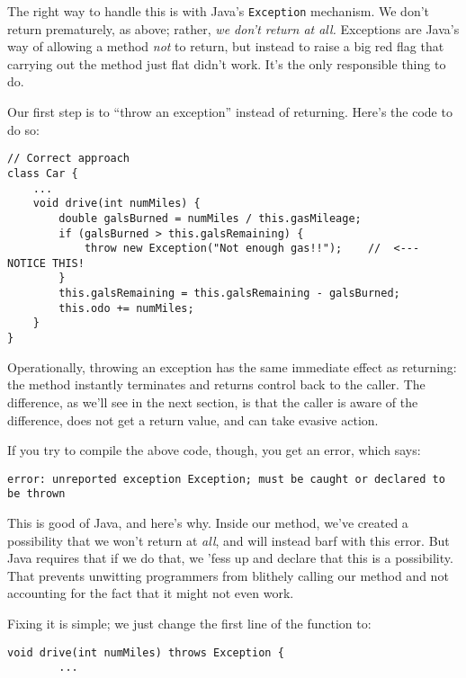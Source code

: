 The right way to handle this is with Java's \texttt{Exception} mechanism. We
don't return prematurely, as above; rather, \textit{we don't return at all.}
Exceptions are Java's way of allowing a method \textit{not} to return, but
instead to raise a big red flag that carrying out the method just flat didn't
work. It's the only responsible thing to do.

Our first step is to ``throw an exception'' instead of returning. Here's the
code to do so:

\begin{Verbatim}[samepage=true,fontsize=\scriptsize,frame=single]
// Correct approach
class Car {
    ...
    void drive(int numMiles) {
        double galsBurned = numMiles / this.gasMileage;
        if (galsBurned > this.galsRemaining) {
            throw new Exception("Not enough gas!!");    //  <---  NOTICE THIS!
        }
        this.galsRemaining = this.galsRemaining - galsBurned;
        this.odo += numMiles;
    }
}
\end{Verbatim}

Operationally, throwing an exception has the same immediate effect as
returning: the method instantly terminates and returns control back to the
caller. The difference, as we'll see in the next section, is that the caller
is aware of the difference, does not get a return value, and can take evasive
action.

If you try to compile the above code, though, you get an error, which says:

\begin{Verbatim}[samepage=true,fontsize=\small]
error: unreported exception Exception; must be caught or declared to be thrown
\end{Verbatim}

This is good of Java, and here's why. Inside our method, we've created a
possibility that we won't return at \textit{all}, and will instead barf with
this error. But Java requires that if we do that, we 'fess up and declare that
this is a possibility. That prevents unwitting programmers from blithely
calling our method and not accounting for the fact that it might not even
work.

Fixing it is simple; we just change the first line of the function to:

\begin{Verbatim}[samepage=true,fontsize=\scriptsize,frame=single]
    void drive(int numMiles) throws Exception {
        ...
\end{Verbatim}

